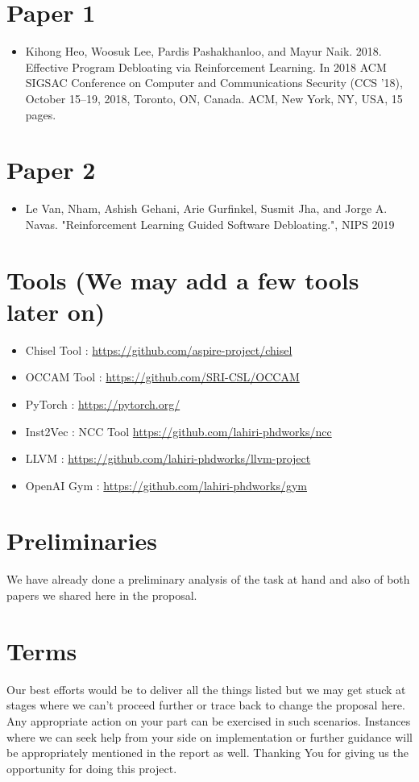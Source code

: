 \documentclass{article} %
\begin{document}
\section*{Paper 1}
\begin{itemize}
    \item \color{blue} Kihong Heo, Woosuk Lee, Pardis Pashakhanloo, and Mayur Naik. 2018.
    Effective Program Debloating via Reinforcement Learning. In 2018 ACM
    SIGSAC Conference on Computer and Communications Security (CCS ’18), October
    15–19, 2018, Toronto, ON, Canada. ACM, New York, NY, USA, 15 pages.
\end{itemize}

\section*{Paper 2}
\begin{itemize}
    \item \color{blue} Le Van, Nham, Ashish Gehani, Arie Gurfinkel, Susmit Jha, and Jorge A. Navas. "Reinforcement Learning Guided Software Debloating.", NIPS 2019
\end{itemize}

\section*{Tools (We may add a few tools later on)}
\begin{itemize}
    \item Chisel Tool : \url{https://github.com/aspire-project/chisel}
    \item OCCAM Tool : \url{https://github.com/SRI-CSL/OCCAM}
    \item PyTorch : \url{https://pytorch.org/}
    \item Inst2Vec : NCC Tool \url{https://github.com/lahiri-phdworks/ncc}
    \item LLVM : \url{https://github.com/lahiri-phdworks/llvm-project}
    \item OpenAI Gym : \url{https://github.com/lahiri-phdworks/gym}
\end{itemize}

\section*{Preliminaries}
We have already done a preliminary analysis of the task at hand and also of both papers we shared here in the proposal. 

\section*{Terms}
Our best efforts would be to deliver all the things listed but we may get stuck at stages where we can't proceed further or trace back to change the proposal here. 
Any appropriate action on your part can be exercised in such scenarios. Instances where we can seek help from your side on implementation or further guidance will be appropriately mentioned in the report as well. Thanking You for giving us the opportunity for doing this project.  
\end{document}
